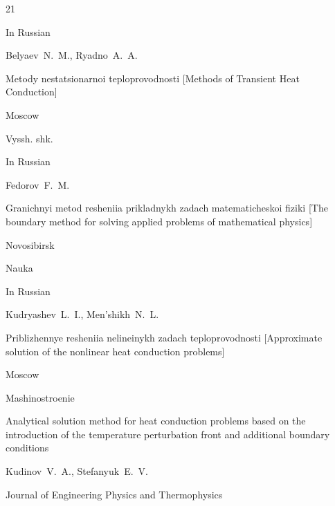 \begin{thebibliography}{21}





\lang In Russian

\by Belyaev~N.~M., Ryadno~A.~A.

\book Metody nestatsionarnoi teploprovodnosti \rm [Methods of Transient Heat Conduction]

\publaddr Moscow

\publ Vyssh. shk.








\lang In Russian

\by Fedorov~F.~M.

\book Granichnyi metod resheniia prikladnykh zadach matematicheskoi fiziki \rm [The boundary method for solving applied problems of mathematical physics]

\publaddr Novosibirsk

\publ Nauka








\lang In Russian

\by Kudryashev~L.~I., Men'shikh~N.~L.

\book Priblizhennye resheniia nelineinykh zadach teploprovodnosti \rm [Approximate solution of the nonlinear heat conduction problems]

\publaddr Moscow

\publ Mashinostroenie








\paper Analytical solution method for heat conduction problems based on the introduction of the temperature perturbation front and additional boundary conditions

\by Kudinov~V.~A., Stefanyuk~E.~V.

\jour Journal of Engineering Physics and Thermophysics



\end{thebibliography}
